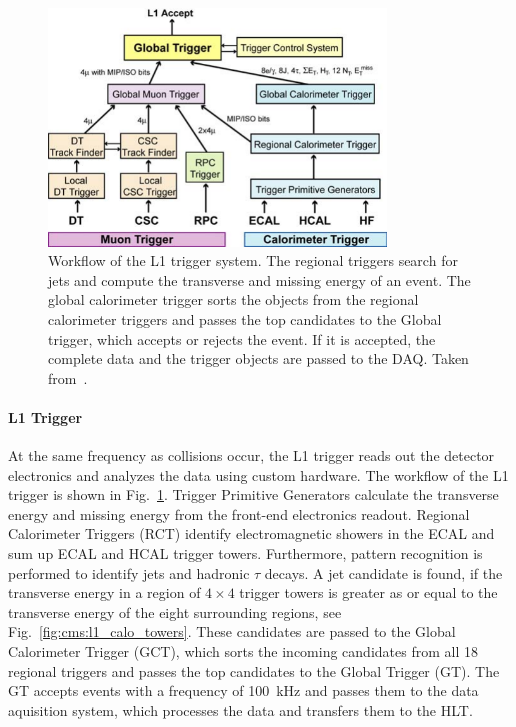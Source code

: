 \begin{figure}[htp]
    \centering
    \includegraphics[width=0.8\textwidth]{figures/experimental_setup/cms_l1_trigger_new.pdf}\hfill
    \caption[The L1 Trigger of CMS]{Workflow of the L1 trigger system. The
        regional triggers search for jets and compute the transverse and missing
        energy of an event. The global calorimeter trigger sorts the objects
        from the regional calorimeter triggers and passes the top candidates to
        the Global trigger, which accepts or rejects the event. If it is
        accepted, the complete data and the trigger objects are passed to the
        DAQ. Taken from~\cite{Bayatian:922757}.} 
    \label{fig:cms:l1_trigger}
\end{figure}

\paragraph{L1 Trigger} 
At the same frequency as collisions occur, the L1 trigger reads out the detector
electronics and analyzes the data using custom hardware. The workflow of the L1
trigger is shown in Fig.~\ref{fig:cms:l1_trigger}. Trigger Primitive Generators
calculate the transverse energy and missing energy from the front-end electronics
readout. Regional Calorimeter Triggers (RCT) identify electromagnetic showers
in the ECAL and sum up ECAL and HCAL trigger towers. Furthermore, pattern
recognition is performed to identify jets and hadronic $\tau$ decays. A jet
candidate is found, if the transverse energy in a region of $4\times4$ trigger
towers is greater as or equal to the transverse energy of the eight surrounding
regions, see Fig.~\ref{fig:cms:l1_calo_towers}. These
candidates are passed to the Global Calorimeter Trigger (GCT), which sorts the
incoming candidates from all 18 regional triggers and passes the top
candidates to the Global Trigger (GT). The GT accepts events with a frequency
of \SI{100}{\kilo\hertz} and passes them to the data aquisition system, which
processes the data and transfers them to the HLT.

